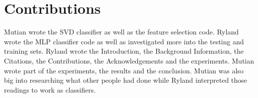 
\section{Contributions}
\label{sec:contrib}

Mutian wrote the SVD classifier as well as the feature selection
code. Ryland wrote the MLP classifier code as well as investigated
more into the testing and training sets. Ryland wrote the
Introduction, the Background Information, the Citations, the
Contributions, the Acknowledgements and the experiments. Mutian wrote part of
the experiments, the results and the conclusion. Mutian was
also big into researching what other people had done while Ryland
interpreted those readings to work as classifiers.
